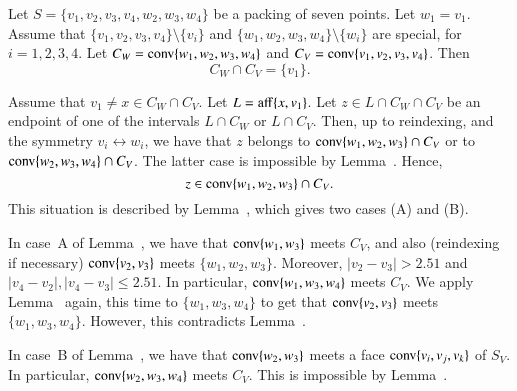 \begin{tarskidata}
\begin{tarski}
\begin{lemma}
Let $S=\{v_1,v_2,v_3,v_4,w_2,w_3,w_4\}$ be a packing of seven
points.
Let $w_1=v_1$.
Assume that $\{v_1,v_2,v_3,v_4\}\setminus\{v_i\}$ and
$\{w_1,w_2,w_3,w_4\}\setminus\{w_i\}$ are special, for $i=1,2,3,4$.
Let 
   $C_W ={\operatorname{conv}}\{w_1,w_2,w_3,w_4\}$ and
$C_V = {\operatorname{conv}}\{v_1,v_2,v_3,v_4\}$.  
Then
  $$
  C_W \cap C_V = \{v_1\}.
  $$
\end{lemma}

\begin{proved}  Assume that $v_1\ne x\in C_W\cap C_V$.
Let $L={\operatorname{aff}}\{x,v_1\}$.  Let $z\in L\cap C_W\cap C_V$ be an endpoint
of one of the intervals $L\cap C_W$ or $L\cap C_V$.  Then, up
to reindexing, and the symmetry $v_i\leftrightarrow w_i$,  we have
that $z$
belongs to ${\operatorname{conv}}\{w_1,w_2,w_3\}\cap C_V$ or to
${\operatorname{conv}}\{w_2,w_3,w_4\}\cap C_V$.  The latter case is impossible
by Lemma~.  Hence,  
   $$z\in{\operatorname{conv}}\{w_1,w_2,w_3\}\cap C_V.$$  This situation
is described by Lemma~, which gives two cases (A)
and (B). 

In case~A of Lemma~, we have that
${\operatorname{conv}}\{w_1,w_3\}$ meets $C_V$, and also (reindexing if necessary)
${\operatorname{conv}}\{v_2,v_3\}$ meets $\{w_1,w_2,w_3\}$.
Moreover, $|v_2-v_3|>2.51$ and $|v_4-v_2|,|v_4-v_3|\le 2.51$.
In particular, ${\operatorname{conv}}\{w_1,w_3,w_4\}$
meets $C_V$.  We apply Lemma~ again, this
time to $\{w_1,w_3,w_4\}$ to get that ${\operatorname{conv}}\{v_2,v_3\}$ meets
$\{w_1,w_3,w_4\}$.  However, this contradicts Lemma~.

In case~B of Lemma~, 
we have that ${\operatorname{conv}}\{w_2,w_3\}$
meets a face ${\operatorname{conv}}\{v_i,v_j,v_k\}$ of $S_V$.  In particular,
${\operatorname{conv}}\{w_2,w_3,w_4\}$ meets $C_V$.  This is impossible
by Lemma~.
\swallowed\end{proved}
\end{tarski}





\begin{tarski}


\end{tarski}
\end{tarskidata}
